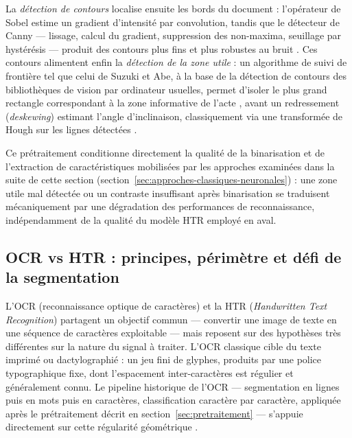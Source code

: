 La \emph{détection de contours} localise ensuite les bords du document : l'opérateur de Sobel estime un gradient d'intensité par convolution, tandis que le détecteur de Canny --- lissage, calcul du gradient, suppression des non-maxima, seuillage par hystérésis --- produit des contours plus fins et plus robustes au bruit \cite{canny1986edge}. Ces contours alimentent enfin la \emph{détection de la zone utile} : un algorithme de suivi de frontière tel que celui de Suzuki et Abe, à la base de la détection de contours des bibliothèques de vision par ordinateur usuelles, permet d'isoler le plus grand rectangle correspondant à la zone informative de l'acte \cite{suzuki1985topological}, avant un redressement (\emph{deskewing}) estimant l'angle d'inclinaison, classiquement via une transformée de Hough sur les lignes détectées \cite{duda1972hough}.

Ce prétraitement conditionne directement la qualité de la binarisation et de l'extraction de caractéristiques mobilisées par les approches examinées dans la suite de cette section (section~\ref{sec:approches-classiques-neuronales}) : une zone utile mal détectée ou un contraste insuffisant après binarisation se traduisent mécaniquement par une dégradation des performances de reconnaissance, indépendamment de la qualité du modèle HTR employé en aval.

\subsection{OCR vs HTR : principes, périmètre et défi de la segmentation}
\label{sec:ocr-vs-htr}

L'OCR (reconnaissance optique de caractères) et la HTR (\textit{Handwritten Text Recognition}) partagent un objectif commun --- convertir une image de texte en une séquence de caractères exploitable --- mais reposent sur des hypothèses très différentes sur la nature du signal à traiter.
L'OCR classique cible du texte imprimé ou dactylographié : un jeu fini de glyphes, produits par une police typographique fixe, dont l'espacement inter-caractères est régulier et généralement connu.
Le pipeline historique de l'OCR --- segmentation en lignes puis en mots puis en caractères, classification caractère par caractère, appliquée après le prétraitement décrit en section~\ref{sec:pretraitement} --- s'appuie directement sur cette régularité géométrique \cite{Plamondon2000OnLineAO}.

